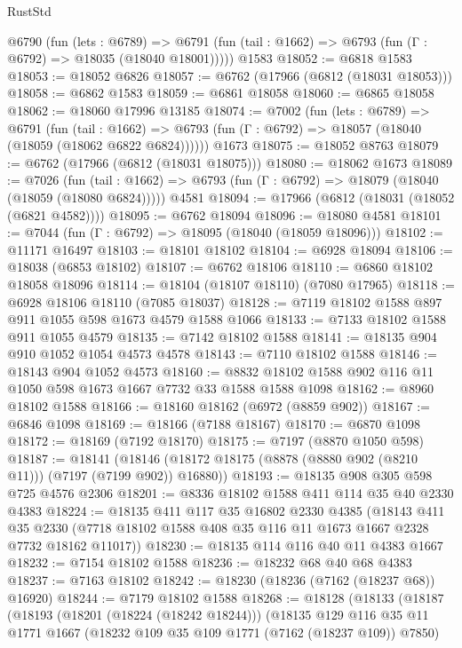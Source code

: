 \begin{lexlean}{RustStd}
\begin{coremodule}
    @6790
      (fun (lets : @6789) =>
      @6791 (fun (tail : @1662) => @6793 (fun (Γ : @6792) => @18035 (@18040 @18001)))))
    @1583
@18052 := @6818 @1583
@18053 := @18052 @6826
@18057 := @6762 (@17966 (@6812 (@18031 @18053)))
@18058 := @6862 @1583
@18059 := @6861 @18058
@18060 := @6865 @18058
@18062 := @18060 @17996 @13185
@18074 := @7002
    (fun (lets : @6789) =>
    @6791
      (fun (tail : @1662) =>
      @6793 (fun (Γ : @6792) => @18057 (@18040 (@18059 (@18062 @6822 @6824))))))
    @1673
@18075 := @18052 @8763
@18079 := @6762 (@17966 (@6812 (@18031 @18075)))
@18080 := @18062 @1673
@18089 := @7026
    (fun (tail : @1662) => @6793 (fun (Γ : @6792) => @18079 (@18040 (@18059 (@18080 @6824)))))
    @4581
@18094 := @17966 (@6812 (@18031 (@18052 (@6821 @4582))))
@18095 := @6762 @18094
@18096 := @18080 @4581
@18101 := @7044 (fun (Γ : @6792) => @18095 (@18040 (@18059 @18096)))
@18102 := @11171 @16497
@18103 := @18101 @18102
@18104 := @6928 @18094
@18106 := @18038 (@6853 @18102)
@18107 := @6762 @18106
@18110 := @6860 @18102 @18058 @18096
@18114 := @18104 (@18107 @18110) (@7080 @17965)
@18118 := @6928 @18106 @18110 (@7085 @18037)
@18128 := @7119 @18102 @1588 @897 @911 @1055 @598 @1673 @4579 @1588 @1066
@18133 := @7133 @18102 @1588 @911 @1055 @4579
@18135 := @7142 @18102 @1588
@18141 := @18135 @904 @910 @1052 @1054 @4573 @4578
@18143 := @7110 @18102 @1588
@18146 := @18143 @904 @1052 @4573
@18160 := @8832 @18102 @1588 @902 @116 @11 @1050 @598 @1673 @1667 @7732 @33 @1588 @1588 @1098
@18162 := @8960 @18102 @1588
@18166 := @18160 @18162 (@6972 (@8859 @902))
@18167 := @6846 @1098
@18169 := @18166 (@7188 @18167)
@18170 := @6870 @1098
@18172 := @18169 (@7192 @18170)
@18175 := @7197 (@8870 @1050 @598)
@18187 := @18141
    (@18146 (@18172 @18175 (@8878 (@8880 @902 (@8210 @11))) (@7197 (@7199 @902)) @16880))
@18193 := @18135 @908 @305 @598 @725 @4576 @2306
@18201 := @8336 @18102 @1588 @411 @114 @35 @40 @2330 @4383
@18224 := @18135
    @411
    @117
    @35
    @16802
    @2330
    @4385
    (@18143
      @411
      @35
      @2330
      (@7718 @18102 @1588 @408 @35 @116 @11 @1673 @1667 @2328 @7732 @18162 @11017))
@18230 := @18135 @114 @116 @40 @11 @4383 @1667
@18232 := @7154 @18102 @1588
@18236 := @18232 @68 @40 @68 @4383
@18237 := @7163 @18102
@18242 := @18230 (@18236 (@7162 (@18237 @68)) @16920)
@18244 := @7179 @18102 @1588
@18268 := @18128
    (@18133
      (@18187
        (@18193
          (@18201 (@18224 (@18242 @18244)))
          (@18135
            @129
            @116
            @35
            @11
            @1771
            @1667
            (@18232 @109 @35 @109 @1771 (@7162 (@18237 @109)) @7850)

\end{coremodule}
\end{lexlean}
